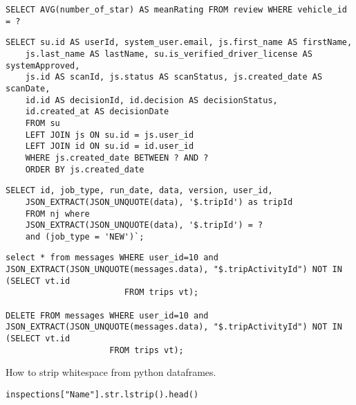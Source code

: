 \begin{lstlisting}[caption={SQL Query example}]
SELECT AVG(number_of_star) AS meanRating FROM review WHERE vehicle_id = ?
\end{lstlisting}

\begin{lstlisting}[caption={SQL Query example verification}]
SELECT su.id AS userId, system_user.email, js.first_name AS firstName,
    js.last_name AS lastName, su.is_verified_driver_license AS systemApproved,
    js.id AS scanId, js.status AS scanStatus, js.created_date AS scanDate,
    id.id AS decisionId, id.decision AS decisionStatus,
    id.created_at AS decisionDate
    FROM su
    LEFT JOIN js ON su.id = js.user_id
    LEFT JOIN id ON su.id = id.user_id
    WHERE js.created_date BETWEEN ? AND ?
    ORDER BY js.created_date
\end{lstlisting}

\begin{lstlisting}[caption={SQL query to get entry from json data}]
SELECT id, job_type, run_date, data, version, user_id,
    JSON_EXTRACT(JSON_UNQUOTE(data), '$.tripId') as tripId
    FROM nj where
    JSON_EXTRACT(JSON_UNQUOTE(data), '$.tripId') = ?
    and (job_type = 'NEW')`;
\end{lstlisting}

\begin{lstlisting}[caption={SQL query to delete from row where activityId is not in table}]
select * from messages WHERE user_id=10 and  JSON_EXTRACT(JSON_UNQUOTE(messages.data), "$.tripActivityId") NOT IN (SELECT vt.id 
                        FROM trips vt);
                        
DELETE FROM messages WHERE user_id=10 and  JSON_EXTRACT(JSON_UNQUOTE(messages.data), "$.tripActivityId") NOT IN (SELECT vt.id 
                     FROM trips vt);
\end{lstlisting}


How to strip whitespace from python dataframes.
\begin{lstlisting}
inspections["Name"].str.lstrip().head()
\end{lstlisting}
